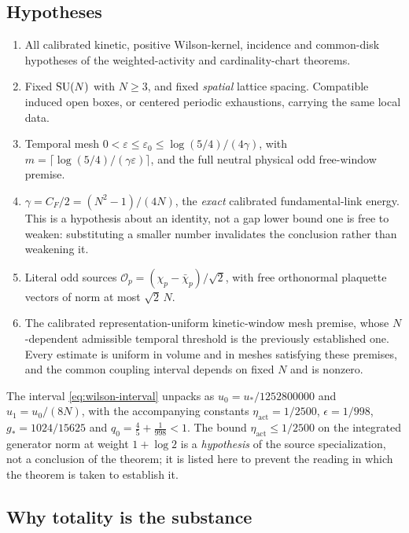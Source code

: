 \subsection{Hypotheses}

\begin{enumerate}
  \item All calibrated kinetic, positive Wilson-kernel, incidence and
    common-disk hypotheses of the weighted-activity and cardinality-chart
    theorems.
  \item Fixed $\mathrm{SU}(N)$ with $N \ge 3$, and fixed \emph{spatial} lattice
    spacing. Compatible induced open boxes, or centered periodic
    exhaustions, carrying the same local data.
  \item Temporal mesh
    $0 < \varepsilon \le \varepsilon_0 \le \log(5/4)/(4\gamma)$, with
    $m = \lceil \log(5/4)/(\gamma\varepsilon) \rceil$, and the full
    neutral physical odd free-window premise.
  \item $\gamma = C_F/2 = (N^2-1)/(4N)$, the \emph{exact} calibrated
    fundamental-link energy. This is a hypothesis about an identity, not
    a gap lower bound one is free to weaken: substituting a smaller
    number invalidates the conclusion rather than weakening it.
  \item Literal odd sources
    $\mathcal{O}_p = (\chi_p - \bar\chi_p)/\sqrt2$, with free
    orthonormal plaquette vectors of norm at most $\sqrt2\,N$.
  \item The calibrated representation-uniform kinetic-window mesh
    premise, whose $N$-dependent admissible temporal threshold is the
    previously established one. Every estimate is uniform in volume and
    in meshes satisfying these premises, and the common coupling
    interval depends on fixed $N$ and is nonzero.
\end{enumerate}

\noindent The interval \eqref{eq:wilson-interval} unpacks as
$u_0 = u_*/1252800000$ and $u_1 = u_0/(8N)$, with the accompanying
constants $\eta_{\mathrm{act}} = 1/2500$, $\epsilon = 1/998$,
$g_* = 1024/15625$ and $q_0 = \tfrac45 + \tfrac1{998} < 1$. The bound
$\eta_{\mathrm{act}} \le 1/2500$ on the integrated generator norm at
weight $1 + \log 2$ is a \emph{hypothesis} of the source
specialization, not a conclusion of the theorem; it is listed here to
prevent the reading in which the theorem is taken to establish it.

\subsection{Why totality is the substance}

